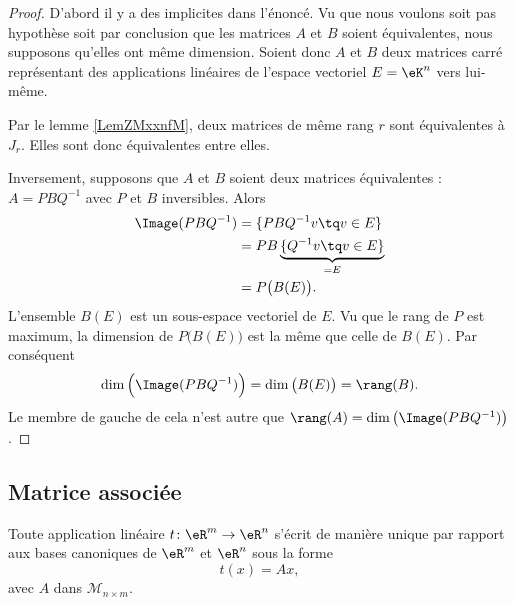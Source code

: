 \begin{proof}
    D'abord il y a des implicites dans l'énoncé. Vu que nous voulons soit pas hypothèse soit par conclusion que les matrices $A$ et \( B\) soient équivalentes, nous supposons qu'elles ont même dimension. Soient donc \( A\) et \( B\) deux matrices carré représentant des applications linéaires de l'espace vectoriel \( E=\eK^n\) vers lui-même.

    Par le lemme \ref{LemZMxxnfM}, deux matrices de même rang \( r\) sont équivalentes à \( J_r\). Elles sont donc équivalentes entre elles.

    Inversement, supposons que \( A\) et \( B\) soient deux matrices équivalentes : \( A=PBQ^{-1}\) avec \( P\) et \( B\) inversibles. Alors
    \begin{subequations}
        \begin{align}
            \Image(PBQ^{-1})&=\{ PBQ^{-1}v\tq v\in E \}\\
            &=PB\underbrace{\{ Q^{-1}v\tq v\in E \}}_{=E}\\
            &=P\big( B(E) \big).
        \end{align}
    \end{subequations}
    L'ensemble \( B(E)\) est un sous-espace vectoriel de \( E\). Vu que le rang de \( P\) est maximum, la dimension de \( P\big( B(E) \big)\) est la même que celle de \( B(E)\). Par conséquent
    \begin{equation}
        \dim\Big( \Image(PBQ^{-1}) \Big)=\dim\big( B(E) \big)=\rang(B).
    \end{equation}
    Le membre de gauche de cela n'est autre que \( \rang(A)=\dim\big( \Image(PBQ^{-1}) \big)\).
\end{proof}

\subsection{Matrice associée}

\begin{proposition}     \label{PROPooCESFooGOZBNI}
 Toute application linéaire \( t\colon \eR^m\to \eR^n\) s'écrit de manière unique par rapport aux bases canoniques de $\eR^m$ et $\eR^n$ sous la forme
\[
t(x)=Ax,
\]
avec $A$ dans $\mathcal{M}_{n\times m}$.
\end{proposition}

